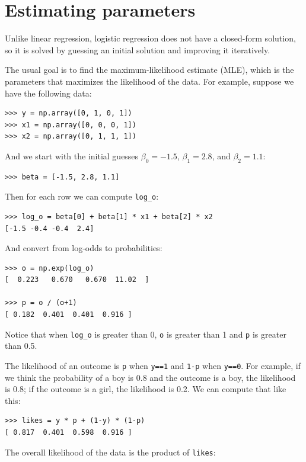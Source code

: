 \documentclass[12pt]{book}
\begin{document}
\section{Estimating parameters}

Unlike linear regression, logistic regression does not have a
closed-form solution, so it is solved by guessing an initial
solution and improving it iteratively.

The usual goal is to find the maximum-likelihood estimate (MLE),
which is the parameters that maximizes the likelihood of the
data.  For example, suppose we have the following data:

\begin{verbatim}
>>> y = np.array([0, 1, 0, 1])
>>> x1 = np.array([0, 0, 0, 1])
>>> x2 = np.array([0, 1, 1, 1])
\end{verbatim}

And we start with the initial guesses $\beta_0=-1.5$, $\beta_1=2.8$,
and $\beta_2=1.1$:

\begin{verbatim}
>>> beta = [-1.5, 2.8, 1.1]
\end{verbatim}

Then for each row we can compute \verb"log_o":

\begin{verbatim}
>>> log_o = beta[0] + beta[1] * x1 + beta[2] * x2 
[-1.5 -0.4 -0.4  2.4]
\end{verbatim}

And convert from log-odds to probabilities:

\begin{verbatim}
>>> o = np.exp(log_o)
[  0.223   0.670   0.670  11.02  ]

>>> p = o / (o+1)
[ 0.182  0.401  0.401  0.916 ]
\end{verbatim}

Notice that when \verb"log_o" is greater than 0, {\tt o}
is greater than 1 and {\tt p} is greater than 0.5.

The likelihood of an outcome is {\tt p} when {\tt y==1} and {\tt 1-p}
when {\tt y==0}.  For example, if we think the probability of a boy is
0.8 and the outcome is a boy, the likelihood is 0.8; if
the outcome is a girl, the likelihood is 0.2.  We can compute that
like this:

\begin{verbatim}
>>> likes = y * p + (1-y) * (1-p)
[ 0.817  0.401  0.598  0.916 ]
\end{verbatim}

The overall likelihood of the data is the product of {\tt likes}:
\end{document}
